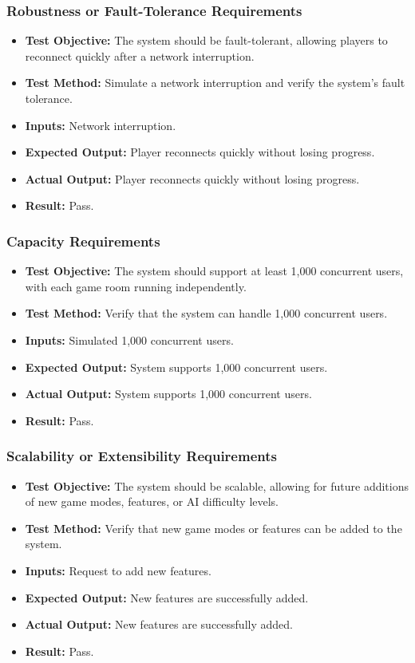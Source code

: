 \documentclass[12pt, titlepage]{article}
\begin{document}
\subsubsection{Robustness or Fault-Tolerance Requirements}
\begin{itemize}
    \item \textbf{Test Objective:} The system should be fault-tolerant, allowing players to reconnect quickly after a network interruption.
    \item \textbf{Test Method:} Simulate a network interruption and verify the system's fault tolerance.
    \item \textbf{Inputs:} Network interruption.
    \item \textbf{Expected Output:} Player reconnects quickly without losing progress.
    \item \textbf{Actual Output:} Player reconnects quickly without losing progress.
    \item \textbf{Result:} Pass.
\end{itemize}

\subsubsection{Capacity Requirements}
\begin{itemize}
    \item \textbf{Test Objective:} The system should support at least 1,000 concurrent users, with each game room running independently.
    \item \textbf{Test Method:} Verify that the system can handle 1,000 concurrent users.
    \item \textbf{Inputs:} Simulated 1,000 concurrent users.
    \item \textbf{Expected Output:} System supports 1,000 concurrent users.
    \item \textbf{Actual Output:} System supports 1,000 concurrent users.
    \item \textbf{Result:} Pass.
\end{itemize}

\subsubsection{Scalability or Extensibility Requirements}
\begin{itemize}
    \item \textbf{Test Objective:} The system should be scalable, allowing for future additions of new game modes, features, or AI difficulty levels.
    \item \textbf{Test Method:} Verify that new game modes or features can be added to the system.
    \item \textbf{Inputs:} Request to add new features.
    \item \textbf{Expected Output:} New features are successfully added.
    \item \textbf{Actual Output:} New features are successfully added.
    \item \textbf{Result:} Pass.
\end{itemize}
\end{document}
